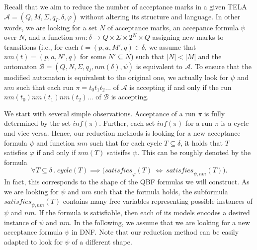 \documentclass[a4paper,UKenglish,cleveref,autoref,thm-restate]{lipics-v2021}
\newcommand{\minf}{\mathit{inf}}
\newcommand{\oM}{N}
\newcommand{\rem}{\mathit{nm}}
\newcommand{\mcycle}{\mathit{cycle}}
\newcommand{\msat}{\mathit{satisfies}}
\newcommand{\mA}{\mathcal{A}}
\newcommand{\mB}{\mathcal{B}}
\begin{document}
Recall that we aim to reduce the number of acceptance marks in a given
TELA $\mA =(Q,M,\Sigma,q_I,\delta,\varphi)$ without altering its
structure and language. In other words, we are looking for a set $\oM$
of acceptance marks, an accepance formula $\psi$ over $\oM$, and a
function
$\rem:\delta\rightarrow Q \times \Sigma \times 2^{\oM}\times Q$
assigning new marks to transitions (i.e., for each
$t=(p,a,M',q)\in\delta$, we assume that $\rem(t)=(p,a,\oM',q)$ for
some $\oM'\subseteq\oM$) such that $|\oM|<|M|$ and the automaton
$\mB=(Q,\oM,\Sigma,q_I,\rem(\delta),\psi)$ is equivalent to $\mA$. To
ensure that the modified automaton is equivalent to the original one,
we actually look for $\psi$ and $\rem$ such that each run
$\pi=t_0t_1t_2\ldots$ of $\mA$ is accepting if and only if the run
$\rem(t_0)\rem(t_1)\rem(t_2)\ldots$ of $\mB$ is accepting.

We start with several simple observations. Acceptance of a run $\pi$
is fully determined by the set $\minf(\pi)$.
Further, each set $\minf(\pi)$ for a run $\pi$ is a cycle and vice
versa. Hence, our reduction methods is looking for a new acceptance
formula $\psi$ and function $\rem$ such that for each cycle
$T\subseteq\delta$, it holds that $T$ satisfies $\varphi$ if and only
if $\rem(T)$ satisifes $\psi$. This can be roughly denoted by the
formula
\[
  \forall T\subseteq\delta~.~\mcycle(T)\implies\big(\msat_\varphi(T) ~\iff~ \msat_{\psi,\rem}(T)\big).
\]
In fact, this corresponds to the shape of the QBF formulas we will
construct. As we are looking for $\psi$ and $\rem$ such that the
formula holds, the subformula $\msat_{\psi,\rem}(T)$ contains many
free variables representing possible instances of $\psi$ and
$\rem$. If the formula is satisfiable, then each of its models encodes
a desired instance of $\psi$ and $\rem$.  In the following, we assume
that we are looking for a new acceptance formula $\psi$ in DNF. Note
that our reduction method can be easily adapted to look for $\psi$ of
a different shape.
\end{document}
